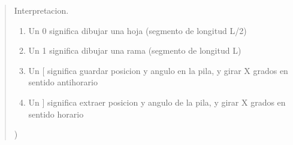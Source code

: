 \begin{boxedminipage}{\funcwidth}
\begin{quote}
{\begin{itemize}
\begin{enumerate}
          \end{enumerate}

      \end{itemize}

      Interpretacion.

      \begin{enumerate}

      \setlength{\parskip}{0.5ex}
        \item Un 0 significa dibujar una hoja (segmento de longitud L/2)

        \item Un 1 significa dibujar una rama (segmento de longitud L)

        \item Un [ significa guardar posicion y angulo en la pila, y girar X 
          grados en sentido antihorario

        \item Un ] significa extraer posicion y angulo de la pila, y girar X 
          grados en sentido horario

      \end{enumerate})}

      \end{quote}

    \end{boxedminipage}

    \label{FractalZE:arbol:Arbol:getHeight}

    \vspace{0.5ex}

